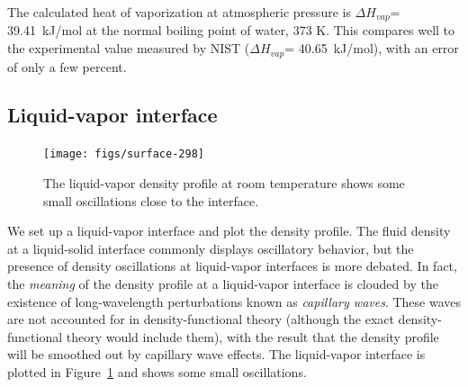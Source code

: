 \documentclass[letterpaper,twocolumn,amsmath,amssymb,prb]{revtex4-1}
\newcommand{\needsworknow}[1]{\textcolor{red}{[\emph{#1}]}}
\begin{document}

The calculated heat of vaporization at atmospheric pressure is
$\Delta H_{vap}$= 39.41~kJ/mol at the normal boiling point of water,
373 K. This compares well to the experimental
value measured by NIST ($\Delta H_{vap}$= 40.65~kJ/mol\cite{nistwater}), with 
an error of only a few percent.


\subsection{Liquid-vapor interface}

\begin{figure}
\begin{center}
\texttt{[image: figs/surface-298]}
\end{center}
\caption{The liquid-vapor density profile at room temperature shows
some small oscillations close to the interface.  }
\label{fig:liquid-vapor-profile}
\end{figure}

We set up a liquid-vapor
interface and plot the density profile.
The fluid density at a liquid-solid interface commonly displays
oscillatory behavior, but the presence of density oscillations at
liquid-vapor interfaces is more debated\cite{penfold2001structure}.
In fact, the \emph{meaning} of the density profile at a liquid-vapor
interface is clouded by the existence of long-wavelength perturbations
known as \emph{capillary waves}.  These waves are not accounted for in
density-functional theory (although the exact
density-functional theory would include them), with the result
that the density profile will be smoothed out by capillary wave effects. 
The liquid-vapor
interface is plotted in Figure~\ref{fig:liquid-vapor-profile} and shows
some small oscillations.
\end{document}
